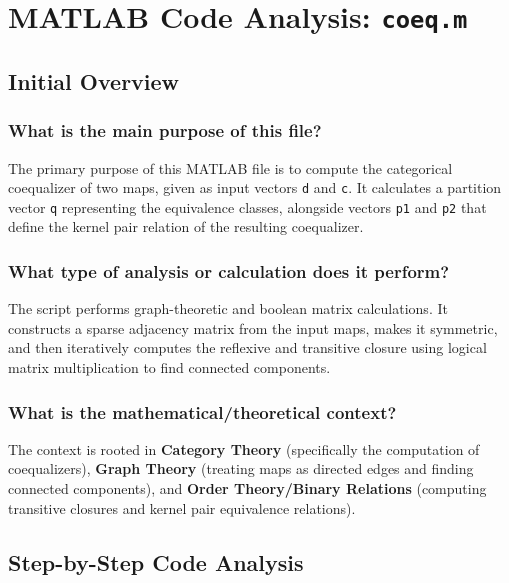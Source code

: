
\chapter{MATLAB Code Analysis: \texttt{coeq.m}}
\author{}
\date{}


\maketitle

\section{Initial Overview}

\subsection*{What is the main purpose of this file?}
The primary purpose of this MATLAB file is to compute the categorical coequalizer of two maps, given as input vectors \texttt{d} and \texttt{c}. It calculates a partition vector \texttt{q} representing the equivalence classes, alongside vectors \texttt{p1} and \texttt{p2} that define the kernel pair relation of the resulting coequalizer.

\subsection*{What type of analysis or calculation does it perform?}
The script performs graph-theoretic and boolean matrix calculations. It constructs a sparse adjacency matrix from the input maps, makes it symmetric, and then iteratively computes the reflexive and transitive closure using logical matrix multiplication to find connected components.

\subsection*{What is the mathematical/theoretical context?}
The context is rooted in \textbf{Category Theory} (specifically the computation of coequalizers), \textbf{Graph Theory} (treating maps as directed edges and finding connected components), and \textbf{Order Theory/Binary Relations} (computing transitive closures and kernel pair equivalence relations). 
\section{Step-by-Step Code Analysis}

